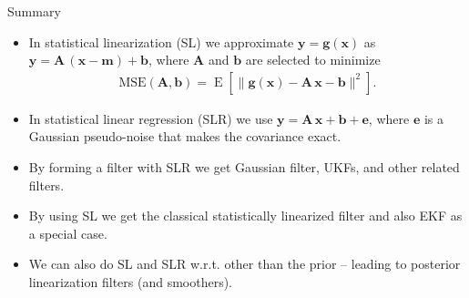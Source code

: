 \documentclass[first=dgreen,second=purple,presentation]{elecslides}
\newcommand{\mbf}[1]{\mathbf{#1}}
\DeclareMathOperator{\E}{E}
\newcommand{\vb}{\mbf{b}}
\newcommand{\ve}{\mbf{e}}
\newcommand{\vg}{\mbf{g}}
\newcommand{\vm}{\mbf{m}}
\newcommand{\vx}{\mbf{x}}
\newcommand{\vy}{\mbf{y}}
\newcommand{\MA}{\mbf{A}}
\begin{document}
\begin{frame}{Summary}
\begin{itemize}[<+->]
\item In \alert{statistical linearization (SL)} we approximate $\vy = \vg(\vx)$ as $\vy = \MA \, (\vx - \vm) + \vb$, where $\MA$ and $\vb$ are selected to minimize
%
\begin{equation}
\begin{split}
  \mathrm{MSE}(\MA,\vb) = \E\left[ \| \vg(\vx) - \MA \, \vx - \vb \|^2 \right].
\end{split}
\nonumber
\end{equation}

\item In \alert{statistical linear regression (SLR)} we use $\vy = \MA \, \vx + \vb + \ve$, where $\ve$ is a Gaussian pseudo-noise that makes the covariance exact.

\item  By forming a filter with SLR we get \alert{Gaussian filter, UKFs, and other related filters}.

\item By using SL we get the classical \alert{statistically linearized filter} and also \alert{EKF} as a special case.

\item We can also do SL and SLR w.r.t. \alert{other than the prior} -- leading to posterior linearization filters (and smoothers).
\end{itemize}
\end{frame}


\end{document}
